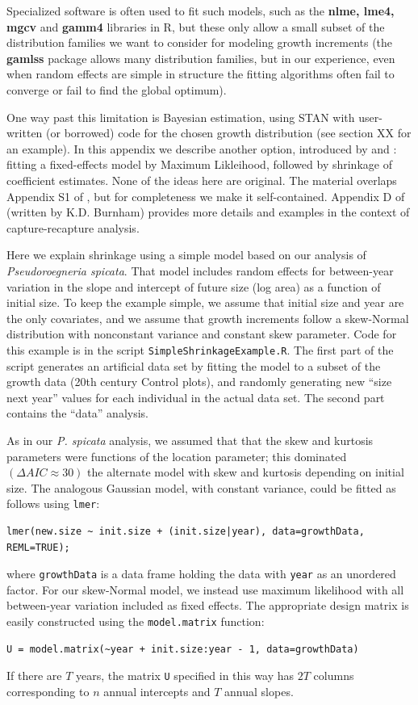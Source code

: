 \documentclass[11pt]{article}
\begin{document}
{Specialized software is often used to fit such models, such as the \textbf{nlme, lme4, mgcv} and \textbf{gamm4} libraries in R,  
but these only allow a small subset of the distribution families we want to consider for modeling growth increments (the \textbf{gamlss} 
package allows many distribution families, but in our experience, even when random effects are simple in structure 
the fitting algorithms often fail to converge or fail to find the global optimum). 

One way past this limitation is Bayesian estimation, using STAN with user-written (or borrowed) 
code for the chosen growth distribution (see section XX for an example). 
In this appendix we describe another option, introduced by \citet{link-nichols-1994} and \citet{gould-nichols-1998}: 
fitting a fixed-effects model by Maximum Likleihood, followed by shrinkage of coefficient estimates. 
None of the ideas here are original. The material overlaps Appendix S1 of \citet{metcalf-etal-2015}, 
but for completeness we make it self-contained. Appendix D of \citet{cooch-white-2020} (written by K.D. Burnham)
provides more details and examples in the context of capture-recapture analysis. 

Here we explain shrinkage using a simple model based on our analysis of \emph{Pseudoroegneria spicata}. 
That model includes random effects for between-year variation in the slope and intercept of future size 
(log area) as a function of initial size. To keep the example simple, we assume that initial size 
and year are the only covariates, and we assume that growth increments 
follow a skew-Normal distribution with nonconstant variance and constant skew parameter. 
Code for this example is in the script \texttt{SimpleShrinkageExample.R}. The first part of the script generates
an artificial data set by fitting the model to a subset of the growth data (20th century Control plots), and
randomly generating new ``size next year'' values for each individual in the actual data set. 
The second part contains the ``data'' analysis. 

As in our \emph{P. spicata} analysis, we assumed that that the skew and kurtosis parameters were functions
of the location parameter; this dominated $(\Delta AIC \approx 30)$ the alternate 
model with skew and kurtosis depending on initial size.   
The analogous Gaussian model, with constant variance, could be fitted as follows using \texttt{lmer}:
\begin{lstlisting}
lmer(new.size ~ init.size + (init.size|year), data=growthData, REML=TRUE); 
\end{lstlisting}
where \texttt{growthData} is a data frame holding the data with \texttt{year} as an unordered factor. For our skew-Normal
model, we instead use maximum likelihood with all between-year variation included as fixed effects. The appropriate design
matrix is easily constructed using the \texttt{model.matrix} function: 
\begin{lstlisting}
U = model.matrix(~year + init.size:year - 1, data=growthData)
\end{lstlisting}
If there are $T$ years, the matrix \texttt{U} specified in this way has $2T$ columns corresponding to $n$ annual 
intercepts and $T$ annual slopes. 

}
\end{document}
